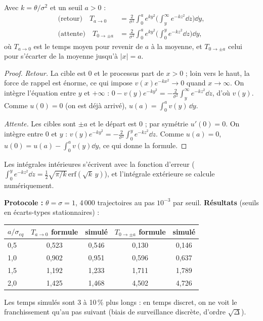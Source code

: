 \begin{proposition}\label{c5:prop:fpt}
Avec $k = \theta/\sigma^2$ et un seuil $a>0$ :
\begin{align*}
\text{(retour)}\quad T_{a\to 0} &= \frac{2}{\sigma^2}\int_0^a e^{ky^2}\Big(\int_y^{\infty}e^{-kz^2}\dd z\Big)\dd y,\\
\text{(attente)}\quad T_{0\to\pm a} &= \frac{2}{\sigma^2}\int_0^a e^{ky^2}\Big(\int_0^{y}e^{-kz^2}\dd z\Big)\dd y,
\end{align*}
où $T_{a\to0}$ est le temps moyen pour revenir de $a$ à la moyenne, et $T_{0\to\pm a}$ celui pour s'écarter de la moyenne jusqu'à $|x| = a$.
\end{proposition}
\begin{proof}
\emph{Retour.} La cible est 0 et le processus part de $x>0$ ; loin vers le haut, la force de rappel est énorme, ce qui impose $v(x)e^{-kx^2}\to0$ quand $x\to\infty$. On intègre l'équation entre $y$ et $+\infty$ : $0 - v(y)e^{-ky^2} = -\frac{2}{\sigma^2}\int_y^\infty e^{-kz^2}\dd z$, d'où $v(y)$. Comme $u(0) = 0$ (on est déjà arrivé), $u(a) = \int_0^a v(y)\,\dd y$.

\emph{Attente.} Les cibles sont $\pm a$ et le départ est 0 ; par symétrie $u'(0) = 0$. On intègre entre 0 et $y$ : $v(y)e^{-ky^2} = -\frac{2}{\sigma^2}\int_0^ye^{-kz^2}\dd z$. Comme $u(a) = 0$, $u(0) = u(a) - \int_0^a v(y)\dd y$, ce qui donne la formule.
\end{proof}

Les intégrales intérieures s'écrivent avec la fonction d'erreur ($\int_0^ye^{-kz^2}\dd z = \frac12\sqrt{\pi/k}\,\mathrm{erf}(\sqrt k\,y)$), et l'intégrale extérieure se calcule numériquement.

\begin{codebox}
\textbf{Protocole :} $\theta = \sigma = 1$, 4\,000 trajectoires au pas $10^{-3}$ par seuil. \textbf{Résultats} (seuils en écarts-types stationnaires) :
\begin{center}\small
\begin{tabular}{lcccc}
\toprule
$a/\sigma_{eq}$ & $T_{a\to0}$ formule & simulé & $T_{0\to\pm a}$ formule & simulé\\
\midrule
0,5 & 0,523 & 0,546 & 0,130 & 0,146\\
1,0 & 0,902 & 0,951 & 0,596 & 0,637\\
1,5 & 1,192 & 1,233 & 1,711 & 1,789\\
2,0 & 1,425 & 1,468 & 4,502 & 4,726\\
\bottomrule
\end{tabular}
\end{center}
Les temps simulés sont 3 à 10\,\% plus longs : en temps discret, on ne voit le franchissement qu'au pas suivant (biais de surveillance discrète, d'ordre $\sqrt{\Delta}$).
\end{codebox}

